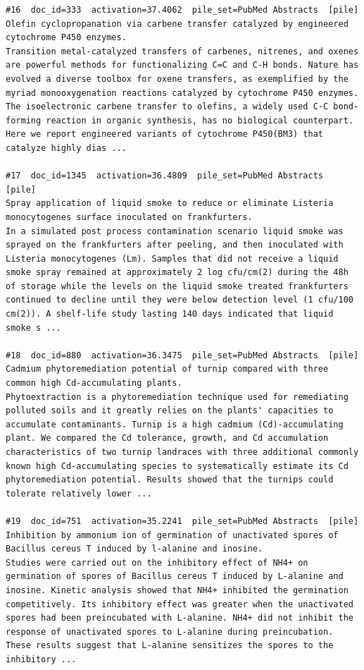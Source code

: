 \begin{verbatim}
#16  doc_id=333  activation=37.4062  pile_set=PubMed Abstracts  [pile]
Olefin cyclopropanation via carbene transfer catalyzed by engineered cytochrome P450 enzymes.
Transition metal-catalyzed transfers of carbenes, nitrenes, and oxenes are powerful methods for functionalizing C=C and C-H bonds. Nature has evolved a diverse toolbox for oxene transfers, as exemplified by the myriad monooxygenation reactions catalyzed by cytochrome P450 enzymes. The isoelectronic carbene transfer to olefins, a widely used C-C bond-forming reaction in organic synthesis, has no biological counterpart. Here we report engineered variants of cytochrome P450(BM3) that catalyze highly dias ...

#17  doc_id=1345  activation=36.4809  pile_set=PubMed Abstracts  [pile]
Spray application of liquid smoke to reduce or eliminate Listeria monocytogenes surface inoculated on frankfurters.
In a simulated post process contamination scenario liquid smoke was sprayed on the frankfurters after peeling, and then inoculated with Listeria monocytogenes (Lm). Samples that did not receive a liquid smoke spray remained at approximately 2 log cfu/cm(2) during the 48h of storage while the levels on the liquid smoke treated frankfurters continued to decline until they were below detection level (1 cfu/100 cm(2)). A shelf-life study lasting 140 days indicated that liquid smoke s ...

#18  doc_id=880  activation=36.3475  pile_set=PubMed Abstracts  [pile]
Cadmium phytoremediation potential of turnip compared with three common high Cd-accumulating plants.
Phytoextraction is a phytoremediation technique used for remediating polluted soils and it greatly relies on the plants' capacities to accumulate contaminants. Turnip is a high cadmium (Cd)-accumulating plant. We compared the Cd tolerance, growth, and Cd accumulation characteristics of two turnip landraces with three additional commonly known high Cd-accumulating species to systematically estimate its Cd phytoremediation potential. Results showed that the turnips could tolerate relatively lower ...

#19  doc_id=751  activation=35.2241  pile_set=PubMed Abstracts  [pile]
Inhibition by ammonium ion of germination of unactivated spores of Bacillus cereus T induced by l-alanine and inosine.
Studies were carried out on the inhibitory effect of NH4+ on germination of spores of Bacillus cereus T induced by L-alanine and inosine. Kinetic analysis showed that NH4+ inhibited the germination competitively. Its inhibitory effect was greater when the unactivated spores had been preincubated with L-alanine. NH4+ did not inhibit the response of unactivated spores to L-alanine during preincubation. These results suggest that L-alanine sensitizes the spores to the inhibitory ...


\end{verbatim}

